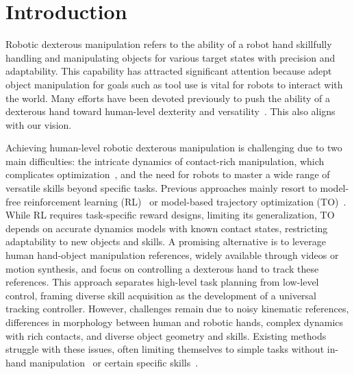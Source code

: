 \section{Introduction}
Robotic dexterous manipulation refers to the ability of a robot hand skillfully handling and manipulating objects for various target states with precision and adaptability. This capability has attracted significant attention because adept object manipulation for goals such as tool use is vital for robots to interact with the world. Many efforts have been devoted previously to push the ability of a dexterous hand toward human-level dexterity and versatility~\citep{rajeswaran2017learning,chen2023visual,chen2021system,akkaya2019solving,christen2022d,zhang2023artigrasp,qin2022dexmv,liu2022herd,wu2023learning,gupta2016learning,wang2023physhoi,mordatch2012contact,liu2024quasisim,Li2024ReinforcementLF}. This also aligns with our vision. 

Achieving human-level robotic dexterous manipulation is challenging due to two main difficulties: the intricate dynamics of contact-rich manipulation, which complicates optimization~\citep{pang2021convex,pang2023global,liu2024quasisim,Jin2024ComplementarityFreeMM}, and the need for robots to master a wide range of versatile skills beyond specific tasks. Previous approaches mainly resort to model-free reinforcement learning (RL)~\citep{chen2023visual,chen2021system,akkaya2019solving,christen2022d,zhang2023artigrasp,qin2022dexmv,liu2022herd,wu2023learning,gupta2016learning,wang2023physhoi} or model-based trajectory optimization (TO)~\citep{pang2021convex,pang2023global,Jin2024ComplementarityFreeMM,hwangbo2018per}. While RL requires task-specific reward designs, limiting its generalization, TO depends on accurate dynamics models with known contact states, restricting adaptability to new objects and skills. A promising alternative is to leverage human hand-object manipulation references, widely available through videos or motion synthesis, and focus on controlling a dexterous hand to track these references. This approach separates high-level task planning from low-level control, framing diverse skill acquisition as the development of a universal tracking controller.
However, challenges remain due to noisy kinematic references, differences in morphology between human and robotic hands, complex dynamics with rich contacts, and diverse object geometry and skills.
Existing methods struggle with these issues, often limiting themselves to simple tasks without in-hand manipulation~\citep{christen2022d,zhang2023artigrasp,wu2023learning,xu2023unidexgrasp,Luo2024GraspingDO,Singh2024HandObjectIP,Chen2024ViViDexLV} or certain specific skills~\citep{qin2022dexmv,liu2024quasisim,rajeswaran2017learning}.

